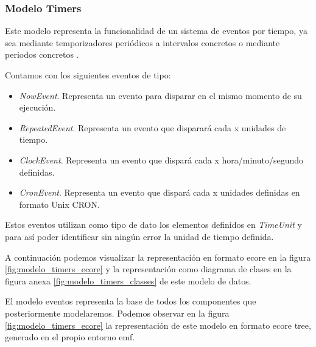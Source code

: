 \subsubsection{Modelo Timers}

Este modelo representa la funcionalidad de un sistema de eventos por tiempo, ya sea mediante temporizadores periódicos a intervalos concretos o mediante periodos concretos \cite{scheduling_sporadic_aperiodic_events}.

Contamos con los siguientes eventos de tipo:

\begin{itemize}

\item \textit{NowEvent}. Representa un evento para disparar en el mismo momento de su ejecución.
\item \textit{RepeatedEvent}. Representa un evento que disparará cada x unidades de tiempo.
\item \textit{ClockEvent}. Representa un evento que dispará cada x hora/minuto/segundo definidas.
\item \textit{CronEvent}. Representa un evento que dispará cada x unidades definidas en formato Unix CRON.

\end{itemize}

Estos eventos utilizan como tipo de dato los elementos definidos en \textit{TimeUnit} y  para así poder identificar sin ningún error la unidad de tiempo definida.

A continuación podemos visualizar la representación en formato \gls{ecore} en la figura \ref{fig:modelo_timers_ecore} y la representación como diagrama de clases en la figura anexa  \ref{fig:modelo_timers_classes} de este modelo de datos.


El modelo eventos representa la base de todos los componentes que posteriormente modelaremos. Podemos observar en la figura \ref{fig:modelo_timers_ecore} la representación de este modelo en formato \gls{ecore} tree, generado en el propio entorno \gls{emf}.

